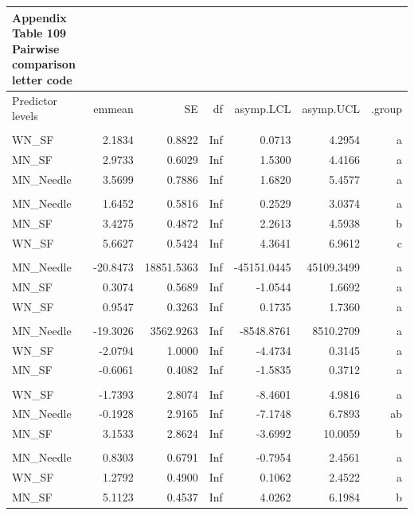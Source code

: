 \documentclass[
  12pt,
  letterpaper,
]{article}
\begin{document}
\begin{longtable}{l|rrrrrr}
\caption*{
{\large \textbf{Appendix Table 109}} \\ 
{\small \textbf{Pairwise comparison letter code}}
} \\ 
\toprule
\multicolumn{1}{l}{Predictor levels} & emmean & SE & df & asymp.LCL & asymp.UCL & .group \\ 
\midrule\addlinespace[2.5pt]
\multicolumn{7}{l}{Brain} \\ 
\midrule\addlinespace[2.5pt]
WN\_SF & 2.1834 & 0.8822 & Inf & 0.0713 & 4.2954 &  a \\ 
MN\_SF & 2.9733 & 0.6029 & Inf & 1.5300 & 4.4166 &  a \\ 
MN\_Needle & 3.5699 & 0.7886 & Inf & 1.6820 & 5.4577 &  a \\ 
\midrule\addlinespace[2.5pt]
\multicolumn{7}{l}{Ear} \\ 
\midrule\addlinespace[2.5pt]
MN\_Needle & 1.6452 & 0.5816 & Inf & 0.2529 & 3.0374 &  a   \\ 
MN\_SF & 3.4275 & 0.4872 & Inf & 2.2613 & 4.5938 &   b  \\ 
WN\_SF & 5.6627 & 0.5424 & Inf & 4.3641 & 6.9612 &    c \\ 
\midrule\addlinespace[2.5pt]
\multicolumn{7}{l}{Eye} \\ 
\midrule\addlinespace[2.5pt]
MN\_Needle & -20.8473 & 18851.5363 & Inf & -45151.0445 & 45109.3499 &  a \\ 
MN\_SF & 0.3074 & 0.5689 & Inf & -1.0544 & 1.6692 &  a \\ 
WN\_SF & 0.9547 & 0.3263 & Inf & 0.1735 & 1.7360 &  a \\ 
\midrule\addlinespace[2.5pt]
\multicolumn{7}{l}{Liver} \\ 
\midrule\addlinespace[2.5pt]
MN\_Needle & -19.3026 & 3562.9263 & Inf & -8548.8761 & 8510.2709 &  a \\ 
WN\_SF & -2.0794 & 1.0000 & Inf & -4.4734 & 0.3145 &  a \\ 
MN\_SF & -0.6061 & 0.4082 & Inf & -1.5835 & 0.3712 &  a \\ 
\midrule\addlinespace[2.5pt]
\multicolumn{7}{l}{Paw} \\ 
\midrule\addlinespace[2.5pt]
WN\_SF & -1.7393 & 2.8074 & Inf & -8.4601 & 4.9816 &  a  \\ 
MN\_Needle & -0.1928 & 2.9165 & Inf & -7.1748 & 6.7893 &  ab \\ 
MN\_SF & 3.1533 & 2.8624 & Inf & -3.6992 & 10.0059 &   b \\ 
\midrule\addlinespace[2.5pt]
\multicolumn{7}{l}{Spleen} \\ 
\midrule\addlinespace[2.5pt]
MN\_Needle & 0.8303 & 0.6791 & Inf & -0.7954 & 2.4561 &  a  \\ 
WN\_SF & 1.2792 & 0.4900 & Inf & 0.1062 & 2.4522 &  a  \\ 
MN\_SF & 5.1123 & 0.4537 & Inf & 4.0262 & 6.1984 &   b \\ 
\bottomrule
\end{longtable}
\end{document}
